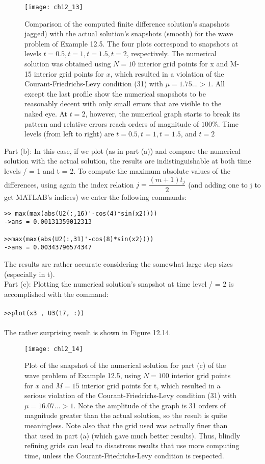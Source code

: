 \documentclass[../main.tex]{subfiles}
\begin{document}
{{\begin{figure}[H]
	\centering
	\texttt{[image: ch12\_13]}
	\caption{\textsf{Comparison of the computed finite difference solution's snapshots jagged) with the actual solution's snapshots (smooth) for the wave problem of Example 12.5. The four plots correspond to snapshots at  levels $t = 0.5, t = 1, t = 1.5, t = 2$, respectively. The numerical solution was obtained using $N=10$ interior grid points for x and M- 15 interior grid points for $x$, which resulted in a violation of the Courant-Friedrichs-Levy condition (31) with $\mu = 1.75... > 1$. All except the last profile show the numerical snapshots to be reasonably decent with only small errors that are  visible to the naked eye. At $t = 2$, however, the numerical graph starts to break its pattern and relative errors reach orders of magnitude of $100\%$. Time levels (from left to right) are $t = 0.5, t = 1, t = 1.5$, and $t =2$}}
	\label{pfig:ch12_13}
\end{figure}
Part (b): In this case, if we plot (as in part (a)) and compare the numerical solution with the actual solution, the results are indistinguishable at both time levels / = 1 and t = 2. To compute the maximum absolute values of the differences, using again the index relation $j=\dfrac{(m+1)t_j}{2}$ (and adding one to j to get MATLAB's indices) we enter the following commands: 

\begin{lstlisting}[numbers=none,frame=none]
>> max(max(abs(U2(:,16)'-cos(4)*sin(x2)))) 
->ans = 0.00131359012313 

>>max(max(abs(U2(:,31)'-cos(8)*sin(x2)))) 
->ans = 0.00343796574347 
\end{lstlisting}
The results are rather accurate considering the somewhat large step sizes (especially in t).
\\
Part (c): Plotting the numerical solution's snapshot at time level / = 2 is accomplished with the command:
\\
\\
\texttt{>>plot(x3 , U3(17, :))}
\\
\\
The rather surprising result is shown in Figure 12.14.
\begin{figure}[H]
	\centering
	\texttt{[image: ch12\_14]}
	\caption{\textsf{Plot of the snapshot of the numerical solution for part (c) of the wave problem of Example 12.5, using $N= 100$ interior grid points for $x$ and $M= 15$ interior grid points for t, which resulted in a serious violation of the Courant-Friedrichs-Levy condition (31) with $\mu = 16.07... > 1$. Note the amplitude of the graph is 31 orders of magnitude greater than the actual solution, so the result is quite meaningless. Note also that the grid used was actually finer than that used in part (a) (which gave much better results). Thus, blindly refining grids can lead to disastrous results that use more computing time, unless the Courant-Friedrichs-Levy condition is respected.}}
	\label{pfig:ch12_14}
\end{figure}


}}
\end{document}
